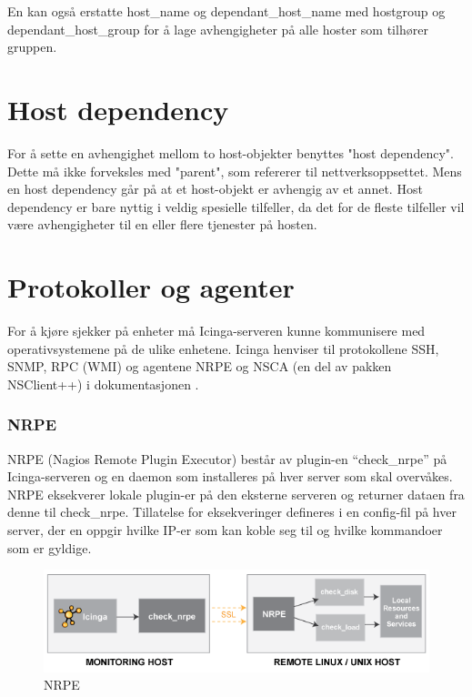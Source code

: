 En kan også erstatte host\_name og dependant\_host\_name med hostgroup og dependant\_host\_group for å lage avhengigheter på alle hoster som tilhører gruppen.

\section{Host dependency}

For å sette en avhengighet mellom to host-objekter benyttes "host dependency". Dette må ikke forveksles med "parent", som refererer til nettverksoppsettet. Mens en host dependency går på at et host-objekt er avhengig av et annet. Host dependency er bare nyttig i veldig spesielle tilfeller, da det for de fleste tilfeller vil være avhengigheter til en eller flere tjenester på hosten\cite{hostandservicedep}.

\section{Protokoller og agenter}
For å kjøre sjekker på enheter må Icinga-serveren kunne kommunisere med operativsystemene på de ulike enhetene. Icinga henviser til protokollene SSH, SNMP, RPC (WMI) og agentene NRPE og NSCA (en del av pakken NSClient++) i dokumentasjonen\cite{icingaintegration} \cite{icingaadditionalsoftware}. 

\subsubsection{NRPE}\label{sec:nrpe}
NRPE (Nagios Remote Plugin Executor) består av plugin-en ``check\_nrpe'' på Icinga-serveren og en daemon som installeres på hver server som skal overvåkes. NRPE eksekverer lokale plugin-er på den eksterne serveren og returner dataen fra denne til check\_nrpe. Tillatelse for eksekveringer defineres i en config-fil på hver server, der en oppgir hvilke IP-er som kan koble seg til og hvilke kommandoer som er gyldige. 

\begin{figure}[H]
    \centering
    \includegraphics[scale=0.6]{img/nrpe.png}
    \caption{NRPE}
    \label{nrpe}
\end{figure}


